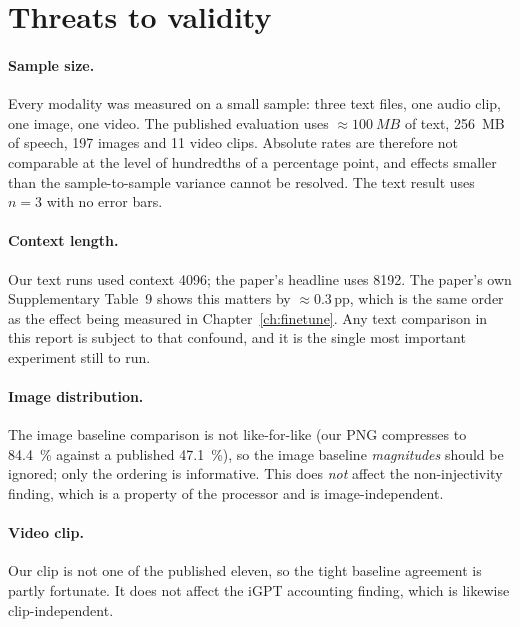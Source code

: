 \documentclass[11pt,a4paper]{article}
\begin{document}
\section{Threats to validity}
\label{ch:threats}

\paragraph{Sample size.} Every modality was measured on a small sample: three text
files, one audio clip, one image, one video. The published evaluation uses
$\approx\SI{100}{MB}$ of text, \SI{256}{MB} of speech, 197 images and 11 video
clips. Absolute rates are therefore not comparable at the level of hundredths of a
percentage point, and effects smaller than the sample-to-sample variance cannot be
resolved. The text result uses $n = 3$ with no error bars.

\paragraph{Context length.} Our text runs used context \num{4096}; the paper's
headline uses \num{8192}. The paper's own Supplementary Table~9 shows this matters
by $\approx\num{0.3}$\,pp, which is the same order as the effect being measured in
Chapter~\ref{ch:finetune}. Any text comparison in this report is subject to that
confound, and it is the single most important experiment still to run.

\paragraph{Image distribution.} The image baseline comparison is not like-for-like
(our PNG compresses to \SI{84.4}{\%} against a published
\SI{47.1}{\%}), so the image baseline \emph{magnitudes} should be ignored;
only the ordering is informative. This does \emph{not} affect the non-injectivity
finding, which is a property of the processor and is image-independent.

\paragraph{Video clip.} Our clip is not one of the published eleven, so the tight
baseline agreement is partly fortunate. It does not affect the iGPT accounting
finding, which is likewise clip-independent.
\end{document}
